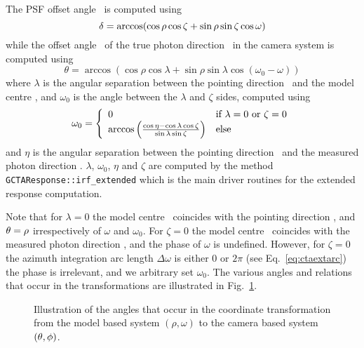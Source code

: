 \documentclass{article}[12pt,a4]
\begin{document}
The PSF offset angle \psfsep\ is computed using
\begin{equation}
\mbox{$\delta$} = \arccos(\cos \rho \cos \zeta + \sin \rho \sin \zeta \cos \omega)
\end{equation}
while the offset angle \off\ of the true photon direction \srcdir\ in the camera system is computed
using
\begin{equation}
\theta = \arccos(\cos \rho \cos \lambda +  \sin \rho \sin \lambda \cos (\omega_0 - \omega))
\end{equation}
where
$\lambda$ is the angular separation between the pointing direction \teldir\ and the
model centre \mdir, and
$\omega_0$ is the angle between the $\lambda$ and $\zeta$ sides, computed using
\begin{equation}
\omega_0 = \left \{
\begin{array}{l l}
\displaystyle
0 & \mbox{if $\lambda = 0$ or $\zeta = 0$} \\
\arccos \left( \frac{\cos \eta - \cos \lambda \cos \zeta}{\sin \lambda \sin \zeta} \right) & \mbox{else}
\end{array}
\right.
\end{equation}
and $\eta$ is the angular separation between the pointing direction \teldir\ and the 
measured photon direction \phdir.
$\lambda$, $\omega_0$, $\eta$ and $\zeta$ are computed by the method
{\tt GCTAResponse::irf\_extended} which is the main driver routines for the
extended response computation.

Note that for $\lambda=0$ the model centre \mdir\ coincides with the pointing direction \teldir,
and $\mbox{$\theta$}=\rho$ irrespectively of $\omega$ and $\omega_0$.
For $\zeta=0$ the model centre \mdir\ coincides with the measured photon direction \phdir,
and the phase of $\omega$ is undefined.
However, for $\zeta=0$ the azimuth integration arc length $\Delta \omega$ is either $0$ or
$2\pi$ (see Eq.~\ref{eq:ctaextarc}) the phase is irrelevant, and we arbitrary set $\omega_0$.
The various angles and relations that occur in the transformations are illustrated in
Fig.~\ref{fig:ctapsfext}.

\begin{figure}[!t]
\center
{}
\caption{Illustration of the angles that occur in the coordinate transformation from the model
based system $(\rho,\omega)$ to the camera based system $(\mbox{$\theta$},\mbox{$\phi$})$.
}
 \label{fig:ctapsfext}
\end{figure}
\end{document}
